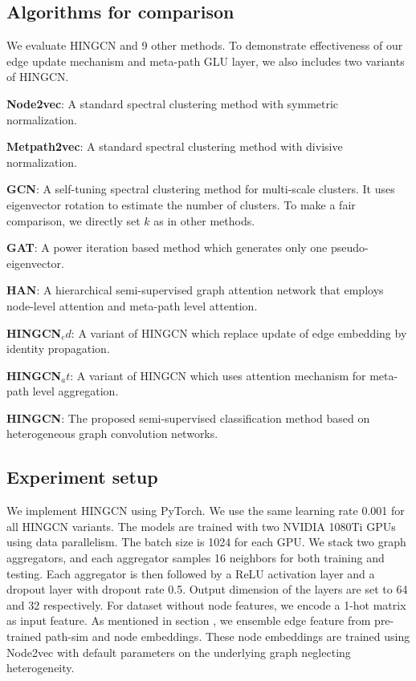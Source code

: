 \subsection{Algorithms for comparison}
\label{sec:algo-comp}
We evaluate HINGCN and 9 other methods. To demonstrate effectiveness of our edge update mechanism and meta-path GLU layer, we also includes two variants of HINGCN.

\noindent{\small$\bullet$}
\textbf{Node2vec}: A standard spectral clustering method with symmetric normalization.

\noindent{\small$\bullet$}
\textbf{Metpath2vec}: A standard spectral clustering method with divisive normalization.

\noindent{\small$\bullet$}
\textbf{GCN}: A self-tuning spectral clustering method for multi-scale clusters.
It uses eigenvector rotation to estimate the number of clusters.
To make a fair comparison, we directly set $k$ as in other methods.

\noindent{\small$\bullet$}
\textbf{GAT}: A power iteration based method which generates only one pseudo-eigenvector.

\noindent{\small$\bullet$}
\textbf{HAN}:
A hierarchical semi-supervised graph attention network that employs node-level attention and meta-path level attention.

\noindent{\small$\bullet$}
\textbf{HINGCN$_ed$}: 
A variant of HINGCN which replace update of edge embedding by identity propagation.

\noindent{\small$\bullet$}
\textbf{HINGCN$_at$}:
A variant of HINGCN which uses attention mechanism for meta-path level aggregation.

\noindent{\small$\bullet$}
\textbf{HINGCN}:
The proposed semi-supervised classification method based on heterogeneous graph convolution networks.


\subsection{Experiment setup}
\label{sec:setup}
We implement HINGCN using PyTorch. We use the same learning rate 0.001 for all HINGCN variants. The models  are trained with two NVIDIA 1080Ti GPUs using data parallelism. The batch size is 1024 for each GPU. We stack two graph aggregators, and each aggregator samples 16 neighbors for both training and testing. Each aggregator is then followed by a ReLU activation layer and a dropout layer with dropout rate 0.5. Output dimension of the layers are set to 64 and 32 respectively. For dataset without node features, we encode a 1-hot matrix as input feature. As mentioned in section , we ensemble edge feature from pre-trained path-sim and node embeddings. These node embeddings are trained using Node2vec with default parameters on the underlying graph neglecting heterogeneity.

